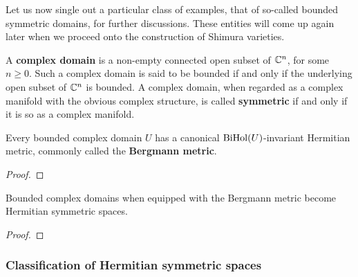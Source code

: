             \begin{example} \label{example: complex_elliptic_curves_are_symmetric_spaces}
                
            \end{example}
            Let us now single out a particular class of examples, that of so-called bounded symmetric domains, for further discussions. These entities will come up again later when we proceed onto the construction of Shimura varieties. 
            \begin{definition}[Domains] \label{def: complex_domains}
                A \textbf{complex domain} is a non-empty connected open subset of $\mathbb{C}^n$, for some $n \geq 0$. Such a complex domain is said to be bounded if and only if the underlying open subset of $\mathbb{C}^n$ is bounded. A complex domain, when regarded as a complex manifold with the obvious complex structure, is called \textbf{symmetric} if and only if it is so as a complex manifold. 
            \end{definition}
            \begin{proposition} \label{prop: bounded}
                Every bounded complex domain $U$ has a canonical $\mathrm{Bi}\mathrm{Hol}(U)$-invariant Hermitian metric, commonly called the \textbf{Bergmann metric}.
            \end{proposition}
                \begin{proof}
                    
                \end{proof}
            \begin{corollary}
                Bounded complex domains when equipped with the Bergmann metric become Hermitian symmetric spaces. 
            \end{corollary}
                \begin{proof}
                    
                \end{proof}
            \begin{example}[]
                
            \end{example}
            
        \subsubsection{Classification of Hermitian symmetric spaces}
        
